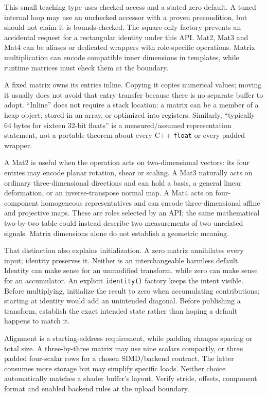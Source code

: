 This small teaching type uses checked access and a stated zero default. A tuned internal loop may use an unchecked accessor with a proven precondition, but should not claim it is bounds-checked. The square-only factory prevents an accidental request for a rectangular identity under this API. Mat2, Mat3 and Mat4 can be aliases or dedicated wrappers with role-specific operations. Matrix multiplication can encode compatible inner dimensions in templates, while runtime matrices must check them at the boundary.

A fixed matrix owns its entries inline. Copying it copies numerical values; moving it usually does not avoid that entry transfer because there is no separate buffer to adopt. ``Inline'' does not require a stack location: a matrix can be a member of a heap object, stored in an array, or optimized into registers. Similarly, ``typically 64 bytes for sixteen 32-bit floats'' is a measured/assumed representation statement, not a portable theorem about every C++ \texttt{float} or every padded wrapper.

A Mat2 is useful when the operation acts on two-dimensional vectors: its four entries may encode planar rotation, shear or scaling. A Mat3 naturally acts on ordinary three-dimensional directions and can hold a basis, a general linear deformation, or an inverse-transpose normal map. A Mat4 acts on four-component homogeneous representatives and can encode three-dimensional affine and projective maps. These are roles selected by an API; the same mathematical two-by-two table could instead describe two measurements of two unrelated signals. Matrix dimensions alone do not establish a geometric meaning.

That distinction also explains initialization. A zero matrix annihilates every input; identity preserves it. Neither is an interchangeable harmless default. Identity can make sense for an unmodified transform, while zero can make sense for an accumulator. An explicit \texttt{identity()} factory keeps the intent visible. Before multiplying, initialize the result to zero when accumulating contributions; starting at identity would add an unintended diagonal. Before publishing a transform, establish the exact intended state rather than hoping a default happens to match it.

Alignment is a starting-address requirement, while padding changes spacing or total size. A three-by-three matrix may use nine scalars compactly, or three padded four-scalar rows for a chosen SIMD/backend contract. The latter consumes more storage but may simplify specific loads. Neither choice automatically matches a shader buffer's layout. Verify stride, offsets, component format and enabled backend rules at the upload boundary.

